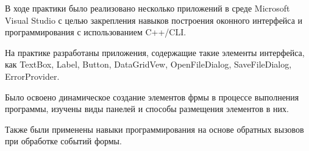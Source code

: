 \conclusion

В ходе практики было реализовано несколько приложений в среде Microsoft Visual Studio с целью закрепления навыков построения оконного интерфейса и программирования с использованием C++/CLI.

На практике разработаны приложения, содержащие такие элементы интерфейса, как TextBox, Label, Button, DataGridVew, OpenFileDialog, SaveFileDialog, ErrorProvider.

Было освоено динамическое создание элементов фрмы в процессе выполнения программы, изучены виды панелей и способы размещения элементов в них.

Также были применены навыки программирования на основе обратных вызовов при обработке событий формы.

